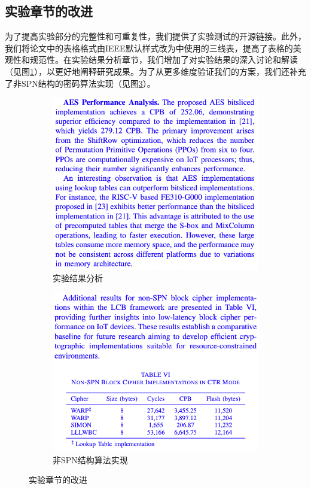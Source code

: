 \documentclass[11pt,a4paper]{article}
\begin{document}
\subsection{实验章节的改进}

为了提高实验部分的完整性和可重复性，我们提供了实验测试的开源链接。此外，我们将论文中的表格格式由IEEE默认样式改为\cite{Liu2020}中使用的三线表，提高了表格的美观性和规范性。在实验结果分析章节，我们增加了对实验结果的深入讨论和解读（见图\ref{fig:experiment}），以更好地阐释研究成果。为了从更多维度验证我们的方案，我们还补充了非SPN结构的密码算法实现（见图\ref{fig:compare}）。

\begin{figure}[h]
  \centering
  \begin{subfigure}[b]{0.3\textwidth}
    \centering
    \includegraphics[width=\textwidth]{./fig/aseAnalysis.png}
    \caption{实验结果分析}
    \label{fig:experiment}
  \end{subfigure}
  \hfill
  \begin{subfigure}[b]{0.3\textwidth}
    \centering
    \includegraphics[width=\textwidth]{./fig/nonSPN.png}
    \caption{非SPN结构算法实现}
    \label{fig:compare}
  \end{subfigure}
  \caption{实验章节的改进}
\end{figure}

\newpage



\end{document}
